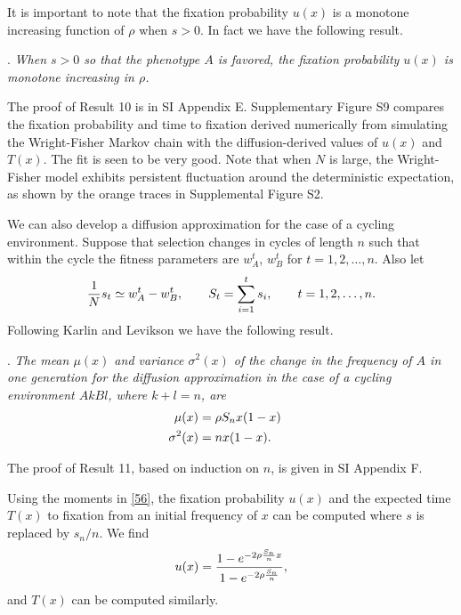 \documentclass[9pt,twocolumn,twoside,lineno]{pnas-new}
\newcommand{\an}[1]{\begin{align}#1\end{align}}
\begin{document}
  It is important to note that the fixation probability $u(x)$ is a monotone increasing function of $\rho$ when $s>0$. In fact we have the following result.
 \medskip
  
. {\sl When $s>0$ so that the phenotype $A$ is favored, the fixation probability $u(x)$ is monotone increasing in $\rho$.}\par
 \medskip
 
 The proof of Result 10 is in SI Appendix E.  
  Supplementary Figure S9 compares the fixation probability and time to fixation derived numerically from  simulating the Wright-Fisher Markov chain with the diffusion-derived values of $u(x)$ and $T(x)$. The fit is seen to be very good. Note that when $N$ is large, the Wright-Fisher model exhibits persistent fluctuation around the deterministic expectation, as shown by the orange traces in Supplemental Figure S2.
 
 We can also develop a diffusion approximation for the case of a cycling environment. Suppose that selection changes in cycles of length $n$ such that within the cycle the fitness parameters are $w_A^t$, $w_B^t$ for $t=1,2,\dots,n$. Also let
 \begin{equation}
 {1\over N}s_t \simeq w_A^t -w_B^t,\qquad S_t =\sum_{i=1}^t s_i,\qquad t=1,2,\dots,n.
 \label{55}\end{equation}
 Following Karlin and Levikson \cite{karlin1974temporal} we have the following result.
 \medskip
 
 . {\sl The mean $\mu(x)$ and variance $\sigma^2(x)$ of the change in the frequency of $A$ in one generation for the diffusion approximation in the case of a cycling environment $AkBl$, where $k+l=n$, are
 \begin{equation}
 \an{
 \mu(x) &= \rho S_n x(1-x)\cr \sigma^2(x) &= nx(1-x).}
 \label{56}\end{equation}}
 
\noindent The proof of Result 11, based on induction on $n$, is given in SI Appendix F.
 
  
 Using the moments in \eqref{56}, the fixation probability $u(x)$ and the expected time $T(x)$ to fixation from an initial frequency of $x$ can be computed where $s$ is replaced by $s_n/n$. We find
 \begin{equation}
 u(x) ={1-e^{-2\rho{S_n\over n}x}\over 1-e^{-2\rho{S_n\over n}}},
\label{57} \end{equation}
 and $T(x)$ can be computed similarly.
 
\end{document}
